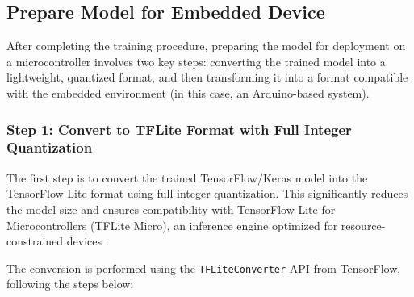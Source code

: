 \subsection{Prepare Model for Embedded Device}

After completing the training procedure, preparing the model for deployment on a microcontroller involves two key steps: converting the trained model into a lightweight, quantized format, and then transforming it into a format compatible with the embedded environment (in this case, an Arduino-based system).

\subsubsection*{Step 1: Convert to TFLite Format with Full Integer Quantization}

The first step is to convert the trained TensorFlow/Keras model into the TensorFlow Lite format using full integer quantization. This significantly reduces the model size and ensures compatibility with TensorFlow Lite for Microcontrollers (TFLite Micro), an inference engine optimized for resource-constrained devices \cite{jacob2018quantization}.

The conversion is performed using the \texttt{TFLiteConverter} API from TensorFlow, following the steps below:

